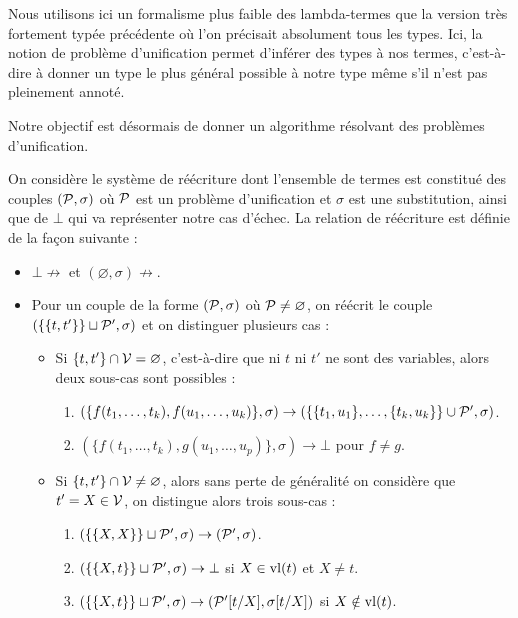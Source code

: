 \begin{rmk}
    Nous utilisons ici un formalisme plus faible des lambda-termes que la version très fortement typée précédente où l'on précisait absolument tous les types. Ici, la notion de problème d'unification permet d'inférer des types à nos termes, c'est-à-dire à donner un type le plus général possible à notre type même s'il n'est pas pleinement annoté.
\end{rmk}

Notre objectif est désormais de donner un algorithme résolvant des problèmes d'unification.

\begin{defi}
    On considère le système de réécriture dont l'ensemble de termes est constitué des couples $(\mathcal P,\sigma)$ où $\mathcal P$ est un problème d'unification et $\sigma$ est une substitution, ainsi que de $\bot$ qui va représenter notre cas d'échec. La relation de réécriture est définie de la façon suivante :
    \begin{itemize}[label=$\bullet$]
        \item $\bot\not\to$ et $(\varnothing,\sigma)\not\to$.
        \item Pour un couple de la forme $(\mathcal P,\sigma)$ où $\mathcal P\neq\varnothing$, on réécrit le couple $(\{\{t,t'\}\}\sqcup \mathcal P',\sigma)$ et on distinguer plusieurs cas :
        \begin{itemize}[label=$\bullet$]
            \item Si $\{t,t'\}\cap \mathcal V = \varnothing$, c'est-à-dire que ni $t$ ni $t'$ ne sont des variables, alors deux sous-cas sont possibles :
            \begin{enumerate}
                \item $(\{f(t_1,\ldots,t_k),f(u_1,\ldots,u_k)\},\sigma)\to (\{\{t_1,u_1\},\ldots,\{t_k,u_k\}\}\cup \mathcal P',\sigma)$.
                \item $(\{f(t_1,\ldots,t_k),g(u_1,\ldots,u_p)\},\sigma)\to \bot$ pour $f\neq g$.
            \end{enumerate}
            \item Si $\{t,t'\}\cap \mathcal V\neq\varnothing$, alors sans perte de généralité on considère que $t' = X \in\mathcal V$, on distingue alors trois sous-cas :
            \begin{enumerate}
                \item $(\{\{X,X\}\}\sqcup \mathcal P',\sigma)\to (\mathcal P',\sigma)$.
                \item $(\{\{X,t\}\}\sqcup \mathcal P',\sigma)\to\bot$ si $X\in\mathrm{vl}(t)$ et $X\neq t$.
                \item $(\{\{X,t\}\}\sqcup\mathcal P',\sigma)\to (\mathcal P'[t/X],\sigma[t/X])$ si $X\notin\mathrm{vl}(t)$.
            \end{enumerate}
        \end{itemize}
    \end{itemize}
\end{defi}


